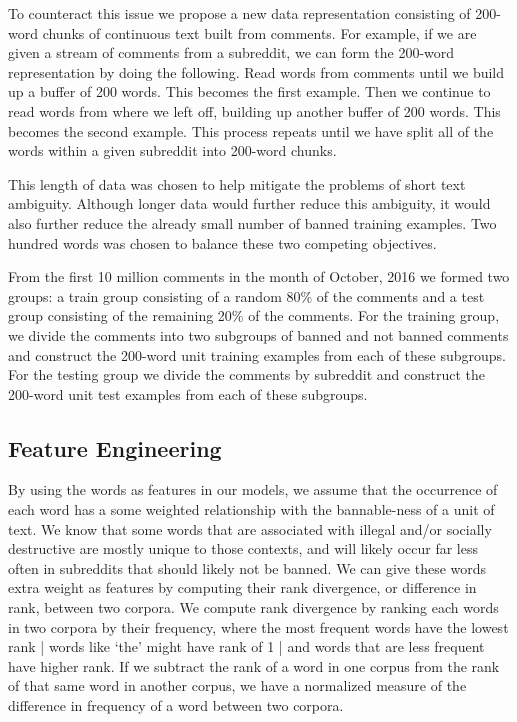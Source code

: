 \documentclass[11pt]{article}[twocolumn]
\begin{document}
To counteract this issue we propose a new data representation consisting of 200-word chunks of continuous text built from comments. For example, if we are given a stream of comments from a subreddit, we can form the 200-word representation by doing the following. Read words from comments until we build up a buffer of 200 words. This becomes the first example. Then we continue to read words from where we left off, building up another buffer of 200 words. This becomes the second example. This process repeats until we have split all of the words within a given subreddit into 200-word chunks.

This length of data was chosen to help mitigate the problems of short text ambiguity. Although longer data would further reduce this ambiguity, it would also further reduce the already small number of banned training examples. Two hundred words was chosen to balance these two competing objectives.

From the first 10 million comments in the month of October, 2016 we formed two groups: a train group consisting of a random 80\% of the comments and a test group consisting of the remaining 20\% of the comments.
For the training group, we divide the comments into two subgroups of banned and not banned comments and construct the 200-word unit training examples from each of these subgroups.
For the testing group we divide the comments by subreddit and construct the 200-word unit test examples from each of these subgroups.


\subsection{Feature Engineering}

By using the words as features in our models, we assume that the occurrence of each word has a some weighted relationship with the bannable-ness of a unit of text.  We know that some words that are associated with illegal and/or socially destructive are mostly unique to those contexts, and will likely occur far less often in subreddits that should likely not be banned.  We can give these words extra weight as features by computing their rank divergence, or difference in rank, between two corpora.  We compute rank divergence by ranking each words in two corpora by their frequency, where the most frequent words have the lowest rank | words like `the' might have rank of 1 | and words that are less frequent have higher rank.  If we subtract the rank of a word in one corpus from the rank of that same word in another corpus, we have a normalized measure of the difference in frequency of a word between two corpora.
\end{document}
